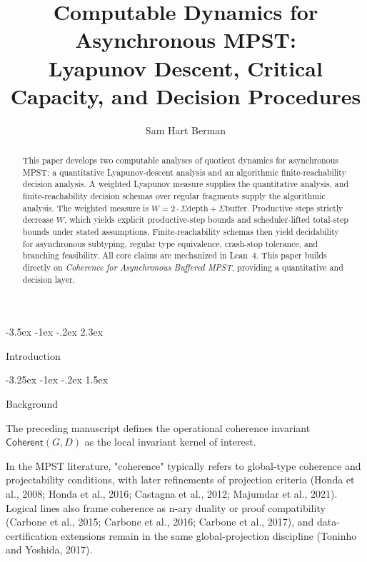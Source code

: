\documentclass[a4paper,10pt,twocolumn,english]{article}
\title{Computable Dynamics for Asynchronous MPST:\\Lyapunov Descent, Critical Capacity, and Decision Procedures}
\author{Sam Hart Berman}
\date{\empty}
\makeatletter
\renewcommand{\section}{\@startsection{section}{1}{\z@}%
  {-3.5ex \@plus -1ex \@minus -.2ex}%
  {2.3ex}%
  {\raggedright\normalfont\large\bfseries}}
\renewcommand{\subsection}{\@startsection{subsection}{2}{\z@}%
  {-3.25ex \@plus -1ex \@minus -.2ex}%
  {1.5ex}%
  {\raggedright\normalfont\normalsize\bfseries}}
\numberwithin{equation}{section}
\theoremstyle{paperdef}
\theoremstyle{paperplain}
\theoremstyle{paperdef}
\theoremstyle{paperremark}
\newcommand{\Coherent}{\ensuremath{\mathsf{Coherent}}}
\makeatother
\begin{document}
\maketitle

\begin{abstract}
	This paper develops two computable analyses of quotient dynamics for asynchronous MPST: a quantitative Lyapunov-descent analysis and an algorithmic finite-reachability decision analysis.
	A weighted Lyapunov measure supplies the quantitative analysis, and finite-reachability
	decision schemas over regular fragments supply the algorithmic analysis. The weighted measure is
	$W = 2 \cdot \Sigma\text{depth} + \Sigma\text{buffer}$. Productive steps strictly decrease $W$,
	which yields explicit productive-step bounds and scheduler-lifted total-step bounds under stated
	assumptions. Finite-reachability schemas then yield decidability for asynchronous subtyping,
	regular type equivalence, crash-stop tolerance, and branching feasibility. All core claims are
	mechanized in Lean~4. This paper builds directly on \emph{Coherence for Asynchronous Buffered MPST},
	providing a quantitative and decision layer.
\end{abstract}

\section{Introduction}
\label{sec:introduction}

\subsection{Background}

The preceding manuscript defines the operational coherence invariant $\Coherent(G,D)$ as the local
invariant kernel of interest.

In the MPST literature, "coherence" typically refers to global-type coherence and projectability conditions,
with later refinements of projection criteria (Honda et al., 2008; Honda et al., 2016; Castagna et al.,
2012; Majumdar et al., 2021). Logical lines also frame coherence as n-ary duality or proof compatibility
(Carbone et al., 2015; Carbone et al., 2016; Carbone et al., 2017), and data-certification extensions
remain in the same global-projection discipline (Toninho and
Yoshida, 2017).
\end{document}
